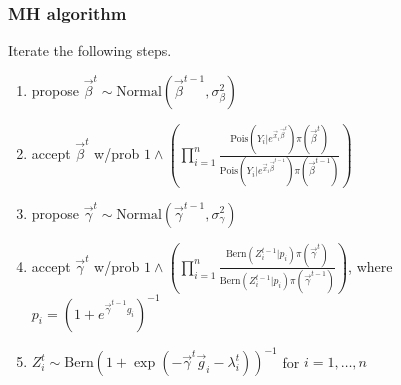 \documentclass{beamer} %
\theoremstyle{definition} %
\begin{document}
\begin{frame}
\frametitle{MH algorithm}
Iterate the following steps. 
 \begin{enumerate}
 \item propose $\vec{\beta}^t\sim \text{Normal}(\vec{\beta}^{t-1},\sigma_{\beta}^2)$
 \item accept $\vec{\beta}^t$ w/prob $1 \wedge \left(\prod_{i=1}^n\frac{\text{Pois}(Y_i \vert e^{\vec{x}_i\vec{\beta}^t}) \pi(\vec{\beta}^t) }{\text{Pois}(Y_i \vert e^{\vec{x}_i\vec{\beta}^{t-1}})\pi(\vec{\beta}^{t-1})} \right)$
  \item propose $\vec{\gamma}^t\sim \text{Normal}(\vec{\gamma}^{t-1},\sigma_{\gamma}^2)$
\item accept $\vec{\gamma}^t$ w/prob $1 \wedge \left(\prod_{i=1}^n\frac{\text{Bern}(Z_i^{t-1} \vert p_i) \pi(\vec{\gamma}^t) }{\text{Bern}(Z_i^{t-1} \vert p_i)\pi(\vec{\gamma}^{t-1})} 
\right)$, where $p_i=(1+e^{\vec{\gamma}^{t-1}g_i})^{-1}$
\item $Z_i^t \sim \text{Bern}(1+\exp(-\vec{\gamma}^{t}\vec{g}_i -\lambda^t_i))^{-1}$ for $i=1,\dots,n$
\end{enumerate}
\end{frame}
\end{document}

